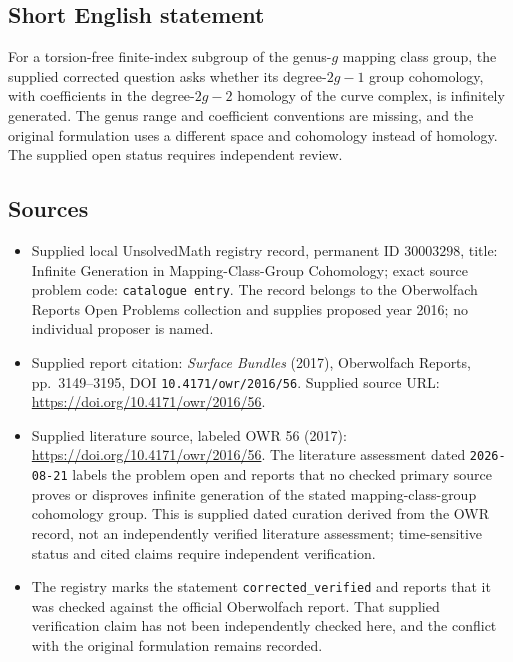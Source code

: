 \documentclass[11pt]{article}
\begin{document}
\subsection{Short English statement}
For a torsion-free finite-index subgroup of the genus-\(g\) mapping class group, the supplied corrected question asks whether its degree-\(2g-1\) group cohomology, with coefficients in the degree-\(2g-2\) homology of the curve complex, is infinitely generated. The genus range and coefficient conventions are missing, and the original formulation uses a different space and cohomology instead of homology. The supplied open status requires independent review.
\subsection{Sources}
\begin{itemize}
\item Supplied local UnsolvedMath registry record, permanent ID \(30003298\), title: Infinite Generation in Mapping-Class-Group Cohomology; exact source problem code: \texttt{catalogue entry}. The record belongs to the Oberwolfach Reports Open Problems collection and supplies proposed year 2016; no individual proposer is named.
\item Supplied report citation: \emph{Surface Bundles} (2017), Oberwolfach Reports, pp.\ 3149--3195, DOI \texttt{10.4171/owr/2016/56}. Supplied source URL: \url{https://doi.org/10.4171/owr/2016/56}.
\item Supplied literature source, labeled OWR 56 (2017): \url{https://doi.org/10.4171/owr/2016/56}. The literature assessment dated \texttt{2026-08-21} labels the problem open and reports that no checked primary source proves or disproves infinite generation of the stated mapping-class-group cohomology group. This is supplied dated curation derived from the OWR record, not an independently verified literature assessment; time-sensitive status and cited claims require independent verification.
\item The registry marks the statement \texttt{corrected\_verified} and reports that it was checked against the official Oberwolfach report. That supplied verification claim has not been independently checked here, and the conflict with the original formulation remains recorded.
\end{itemize}
\end{document}
